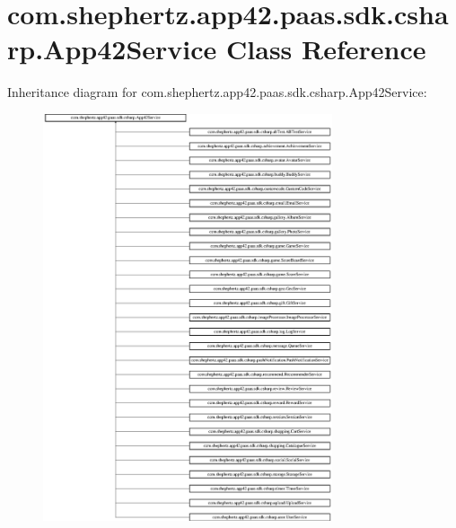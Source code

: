 \hypertarget{classcom_1_1shephertz_1_1app42_1_1paas_1_1sdk_1_1csharp_1_1_app42_service}{\section{com.\+shephertz.\+app42.\+paas.\+sdk.\+csharp.\+App42\+Service Class Reference}
\label{classcom_1_1shephertz_1_1app42_1_1paas_1_1sdk_1_1csharp_1_1_app42_service}
}
Inheritance diagram for com.\+shephertz.\+app42.\+paas.\+sdk.\+csharp.\+App42\+Service\+:\begin{figure}[H]
\begin{center}
\leavevmode
\includegraphics[height=12.000000cm]{classcom_1_1shephertz_1_1app42_1_1paas_1_1sdk_1_1csharp_1_1_app42_service}
\end{center}
\end{figure}

